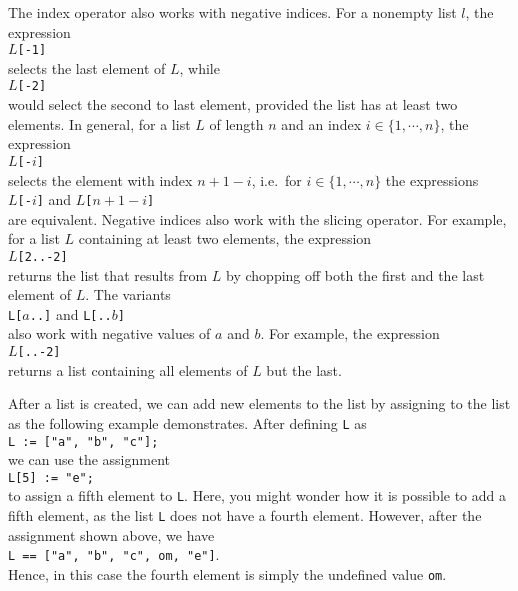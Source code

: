 The index operator also works with negative indices.  For a nonempty list $l$, the expression
\\[0.2cm]
\hspace*{1.3cm}
\texttt{$L$[-1]}
\\[0.2cm]
selects the last element of $L$, while
\\[0.2cm]
\hspace*{1.3cm}
\texttt{$L$[-2]}
\\[0.2cm]
would select the second to last element, provided the list has at least two elements.  In general, for a list $L$ of length $n$ and an index 
$i\in \{1,\cdots,n\}$, the expression
\\[0.2cm]
\hspace*{1.3cm}
\texttt{$L$[-$i$]}
\\[0.2cm]
selects the element with index $n + 1 - i$, i.e.~for $i \in \{1,\cdots,n\}$ the expressions
\\[0.2cm]
\hspace*{1.3cm}
\texttt{$L$[-$i$]} \quad and \quad \texttt{$L$[$n+1-i$]}
\\[0.2cm]
are equivalent.  Negative indices also work with the slicing operator.  For example, for a list $L$
containing at least two elements, the expression
\\[0.2cm]
\hspace*{1.3cm}
\texttt{$L$[2..-2]}
\\[0.2cm]
returns the list that results from $L$ by chopping off both the first and the last element of $L$.
The variants
\\[0.2cm]
\hspace*{1.3cm}
\texttt{L[$a$..]} \quad and \quad \texttt{L[..$b$]}
\\[0.2cm]
also work with negative values of $a$ and $b$.  For example, the expression
\\[0.2cm]
\hspace*{1.3cm}
\texttt{$L$[..-2]}
\\[0.2cm]
returns a list containing all elements of $L$ but the last.

After a list is created, we can add new elements to the list by assigning to the list as the
following example demonstrates.  After defining \texttt{L} as
\\[0.2cm]
\hspace*{1.3cm}
\texttt{L := ["a", "b", "c"];}
\\[0.2cm]
we can use the assignment
\\[0.2cm]
\hspace*{1.3cm}
\texttt{L[5] := "e";}
\\[0.2cm]
to assign a fifth element to \texttt{L}.  Here, you might wonder how it is possible to add a
fifth element, as the list \texttt{L} does not have a fourth element.  However, after the assignment
shown above, we have
\\[0.2cm]
\hspace*{1.3cm}
\texttt{L == ["a", "b", "c", om, "e"]}.
\\[0.2cm]
Hence, in this case the fourth element is simply the undefined value \texttt{om}.

